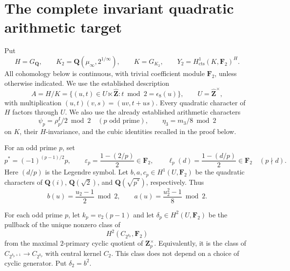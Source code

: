 \section{The complete invariant quadratic arithmetic target}
\label{sec:fr-Y2-target}

Put
\[
 H=G_{\mathbf Q},\qquad
 K_2=\mathbf Q(\mu_\infty,2^{1/\infty}),\qquad
 K=G_{K_2},\qquad
 Y_2=H^1_{\mathrm{cts}}(K,\mathbf F_2)^H.
\]
All cohomology below is continuous, with trivial coefficient module
\(\mathbf F_2\), unless otherwise indicated.
We use the established description
\[
 A=H/K
 =\{(u,t)\in U\ltimes\widehat{\mathbf Z}:
                  t\bmod2=\epsilon_8(u)\},
 \qquad U=\widehat{\mathbf Z}^{\times},
\]
with multiplication
\((u,t)(v,s)=(uv,t+us)\).
Every quadratic character of \(H\) factors through \(U\).
We also use the already established arithmetic characters
\[
 \psi_p=\rho_p^I/2\bmod2\quad(p\text{ odd prime}),\qquad
 \eta_3=m_3/8\bmod2
\]
on \(K\), their \(H\)-invariance, and the cubic identities recalled
in the proof below.

For an odd prime \(p\), set
\[
 p^*=(-1)^{(p-1)/2}p,\qquad
 \varepsilon_p=\frac{1-(2/p)}2\in\mathbf F_2,
 \qquad
 \ell_p(d)=\frac{1-(d/p)}2\in\mathbf F_2
 \quad(p\nmid d).
\]
Here \((d/p)\) is the Legendre symbol.
Let \(b,a,c_p\in H^1(U,\mathbf F_2)\) be the quadratic
characters of \(\mathbf Q(i)\), \(\mathbf Q(\sqrt2)\),
and \(\mathbf Q(\sqrt{p^*})\), respectively.
Thus
\[
 b(u)=\frac{u_2-1}{2}\bmod2,\qquad
 a(u)=\frac{u_2^2-1}{8}\bmod2.
\]

For each odd prime \(p\), let
\(k_p=v_2(p-1)\) and let \(\delta_p\in H^2(U,\mathbf F_2)\)
be the pullback of the unique nonzero class of
\[
 H^2(C_{2^{k_p}},\mathbf F_2)
\]
from the maximal \(2\)-primary cyclic quotient of
\(\mathbf Z_p^\times\).
Equivalently, it is the class of
\(C_{2^{k_p+1}}\to C_{2^{k_p}}\) with central kernel \(C_2\).
This class does not depend on a choice of cyclic generator.
Put \(\delta_2=b^2\).

